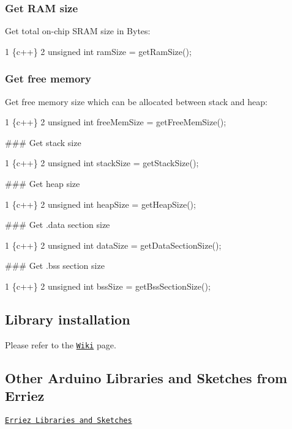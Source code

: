 \subsubsection*{Get R\+AM size}

Get total on-\/chip S\+R\+AM size in Bytes\+: 
\begin{DoxyCode}
1 \{c++\}
2 unsigned int ramSize = getRamSize();
\end{DoxyCode}


\subsubsection*{Get free memory}

Get free memory size which can be allocated between stack and heap\+: 
\begin{DoxyCode}
1 \{c++\}
2 unsigned int freeMemSize = getFreeMemSize();
\end{DoxyCode}


\#\#\# Get stack size 
\begin{DoxyCode}
1 \{c++\}
2 unsigned int stackSize = getStackSize();
\end{DoxyCode}


\#\#\# Get heap size 
\begin{DoxyCode}
1 \{c++\}
2 unsigned int heapSize = getHeapSize();
\end{DoxyCode}


\#\#\# Get .data section size 
\begin{DoxyCode}
1 \{c++\}
2 unsigned int dataSize = getDataSectionSize();
\end{DoxyCode}


\#\#\# Get .bss section size 
\begin{DoxyCode}
1 \{c++\}
2 unsigned int bssSize = getBssSectionSize();
\end{DoxyCode}


\subsection*{Library installation}

Please refer to the \href{https://github.com/Erriez/ErriezArduinoLibrariesAndSketches/wiki}{\tt Wiki} page.

\subsection*{Other Arduino Libraries and Sketches from Erriez}


\begin{DoxyItemize}
\item \href{https://github.com/Erriez/ErriezArduinoLibrariesAndSketches}{\tt Erriez Libraries and Sketches} 
\end{DoxyItemize}